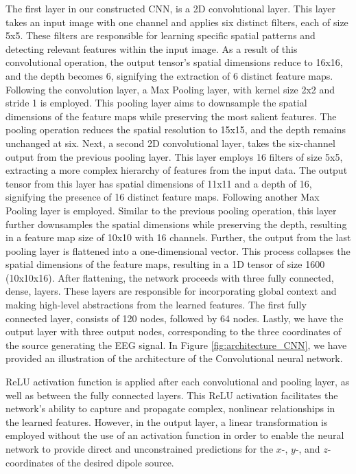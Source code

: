 \documentclass[a4paper, UKenglish, 11pt]{uiomaster}
\begin{document}
The first layer in our constructed CNN, is a 2D convolutional layer. This layer takes an input image with one channel and applies six distinct filters, each of size 5x5. These filters are responsible for learning specific spatial patterns and detecting relevant features within the input image. As a result of this convolutional operation, the output tensor's spatial dimensions reduce to 16x16, and the depth becomes 6, signifying the extraction of 6 distinct feature maps. Following the convolution layer, a Max Pooling layer, with kernel size 2x2 and stride 1 is employed. This pooling layer aims to downsample the spatial dimensions of the feature maps while preserving the most salient features. The pooling operation reduces the spatial resolution to 15x15, and the depth remains unchanged at six. Next, a second 2D convolutional layer, takes the six-channel output from the previous pooling layer. This layer employs 16 filters of size 5x5, extracting a more complex hierarchy of features from the input data. The output tensor from this layer has spatial dimensions of 11x11 and a depth of 16, signifying the presence of 16 distinct feature maps. Following another Max Pooling layer is employed. Similar to the previous pooling operation, this layer further downsamples the spatial dimensions while preserving the depth, resulting in a feature map size of 10x10 with 16 channels. Further, the output from the last pooling layer is flattened into a one-dimensional vector. This process collapses the spatial dimensions of the feature maps, resulting in a 1D tensor of size 1600 (10x10x16). After flattening, the network proceeds with three fully connected, dense, layers. These layers are responsible for incorporating global context and making high-level abstractions from the learned features. The first fully connected layer, consists of 120 nodes, followed by 64 nodes. Lastly, we have the output layer with three output nodes, corresponding to the three coordinates of the source generating the EEG signal. In Figure \ref{fig:architecture_CNN}, we have provided an illustration of the architecture of the Convolutional neural network.

ReLU activation function is applied after each convolutional and pooling layer, as well as between the fully connected layers. This ReLU activation facilitates the network's ability to capture and propagate complex, nonlinear relationships in the learned features. However, in the output layer, a linear transformation is employed without the use of an activation function in order to enable the neural network to provide direct and unconstrained predictions for the $x$-, $y$-, and $z$-coordinates of the desired dipole source.
\end{document}
